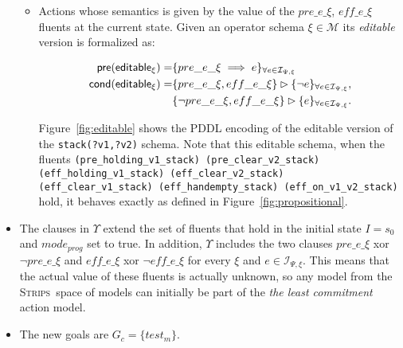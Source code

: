 \documentclass{article}
\newcommand{\pre}{\mathsf{pre}}     %
\newcommand{\cond}{\mathsf{cond}}   %
\newcommand{\strips}{\textsc{Strips}}
\begin{document}
\begin{itemize}
\begin{itemize}
      \item Actions whose semantics is given by the value of the {\small $pre\_e\_\xi$}, {\small $eff\_e\_\xi$} fluents at the current state. Given an operator schema $\xi\in\mathcal{M}$ its {\em editable} version is formalized as:
\begin{small}  
\begin{align*}
\hspace*{7pt}\pre(\mathsf{editable_{\xi}})=&\{pre\_e\_\xi\implies e\}_{\forall e\in{\mathcal I}_{\Psi,\xi}}\\
\cond(\mathsf{editable_{\xi}})=&\{pre\_e\_\xi, eff\_e\_\xi\}\rhd\{\neg e\}_{\forall e\in{\mathcal I}_{\Psi,\xi}},\\
&\{\neg pre\_e\_\xi, eff\_e\_\xi\}\rhd\{e\}_{\forall e\in{\mathcal I}_{\Psi,\xi}}.
\end{align*}
\end{small}
Figure~\ref{fig:editable} shows the PDDL encoding of the editable version of the {\tt\small stack(?v1,?v2)} schema. Note that this editable schema, when the fluents {\tiny\tt (pre\_holding\_v1\_stack) (pre\_clear\_v2\_stack) (eff\_holding\_v1\_stack) (eff\_clear\_v2\_stack) (eff\_clear\_v1\_stack) (eff\_handempty\_stack) (eff\_on\_v1\_v2\_stack)} hold, it behaves exactly as defined in Figure~\ref{fig:propositional}.     
\end{itemize}

\item The clauses in $\Upsilon$ extend the set of fluents that hold in the initial state $I=s_0$ and $mode_{prog}$ set to true. In addition, $\Upsilon$ includes the two clauses $pre\_e\_\xi$ xor $\neg pre\_e\_\xi$ and $eff\_e\_\xi$ xor $\neg eff\_e\_\xi$ for every $\xi$ and $e\in{\mathcal I}_{\Psi,\xi}$. This means that the actual value of these fluents is actually unknown, so any model from the \strips\ space of models can initially be part of the {\em the least commitment} action model. 

\item The new goals are $G_c=\{test_m\}$.
\end{itemize}
\end{document}
